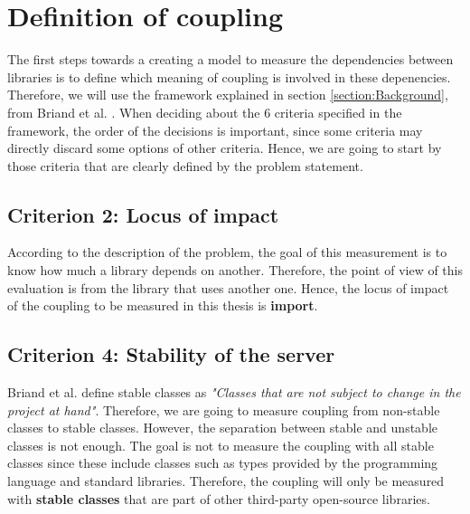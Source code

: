 \documentclass[a4paper]{article}
\begin{document}

\section{Definition of coupling}
The first steps towards a creating a model to measure the dependencies between libraries is to define which meaning of coupling is involved in these depenencies. Therefore, we will use the framework explained in section \ref{section:Background}, from Briand et al. \cite{briand1999unified}. When deciding about the 6 criteria specified in the framework, the order of the decisions is important, since some criteria may directly discard some options of other criteria. Hence, we are going to start by those criteria that are clearly defined by the problem statement.

\subsection{Criterion 2: Locus of impact}
According to the description of the problem, the goal of this measurement is to know how much a library depends on another. Therefore, the point of view of this evaluation is from the library that uses another one. Hence, the locus of impact of the coupling to be measured in this thesis is \textbf{import}.

\subsection{Criterion 4: Stability of the server}
Briand et al. \cite{briand1999unified} define stable classes as \textit{"Classes that are not subject to change in the project at hand"}. Therefore, we are going to measure coupling from non-stable classes to stable classes.
However, the separation between stable and unstable classes is not enough. The goal is not to measure the coupling with all stable classes since these include classes such as types provided by the programming language and standard libraries. Therefore, the coupling will only be measured with \textbf{stable classes} that are part of other third-party open-source libraries.
\end{document}
